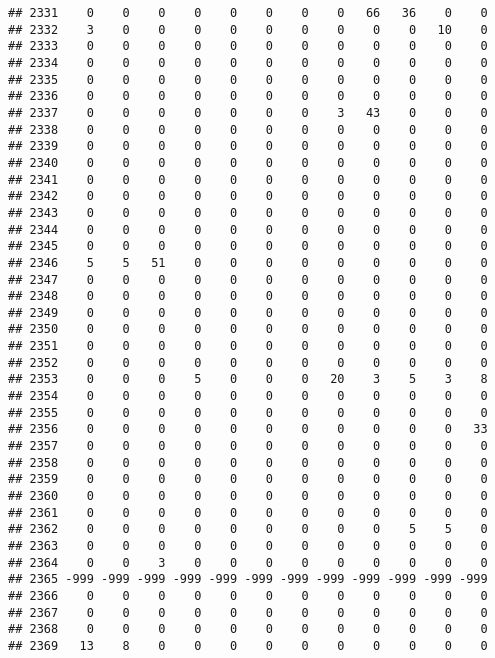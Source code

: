 \documentclass[]{article}
\begin{document}
\begin{verbatim}
## 2331    0    0    0    0    0    0    0    0   66   36    0    0
## 2332    3    0    0    0    0    0    0    0    0    0   10    0
## 2333    0    0    0    0    0    0    0    0    0    0    0    0
## 2334    0    0    0    0    0    0    0    0    0    0    0    0
## 2335    0    0    0    0    0    0    0    0    0    0    0    0
## 2336    0    0    0    0    0    0    0    0    0    0    0    0
## 2337    0    0    0    0    0    0    0    3   43    0    0    0
## 2338    0    0    0    0    0    0    0    0    0    0    0    0
## 2339    0    0    0    0    0    0    0    0    0    0    0    0
## 2340    0    0    0    0    0    0    0    0    0    0    0    0
## 2341    0    0    0    0    0    0    0    0    0    0    0    0
## 2342    0    0    0    0    0    0    0    0    0    0    0    0
## 2343    0    0    0    0    0    0    0    0    0    0    0    0
## 2344    0    0    0    0    0    0    0    0    0    0    0    0
## 2345    0    0    0    0    0    0    0    0    0    0    0    0
## 2346    5    5   51    0    0    0    0    0    0    0    0    0
## 2347    0    0    0    0    0    0    0    0    0    0    0    0
## 2348    0    0    0    0    0    0    0    0    0    0    0    0
## 2349    0    0    0    0    0    0    0    0    0    0    0    0
## 2350    0    0    0    0    0    0    0    0    0    0    0    0
## 2351    0    0    0    0    0    0    0    0    0    0    0    0
## 2352    0    0    0    0    0    0    0    0    0    0    0    0
## 2353    0    0    0    5    0    0    0   20    3    5    3    8
## 2354    0    0    0    0    0    0    0    0    0    0    0    0
## 2355    0    0    0    0    0    0    0    0    0    0    0    0
## 2356    0    0    0    0    0    0    0    0    0    0    0   33
## 2357    0    0    0    0    0    0    0    0    0    0    0    0
## 2358    0    0    0    0    0    0    0    0    0    0    0    0
## 2359    0    0    0    0    0    0    0    0    0    0    0    0
## 2360    0    0    0    0    0    0    0    0    0    0    0    0
## 2361    0    0    0    0    0    0    0    0    0    0    0    0
## 2362    0    0    0    0    0    0    0    0    0    5    5    0
## 2363    0    0    0    0    0    0    0    0    0    0    0    0
## 2364    0    0    3    0    0    0    0    0    0    0    0    0
## 2365 -999 -999 -999 -999 -999 -999 -999 -999 -999 -999 -999 -999
## 2366    0    0    0    0    0    0    0    0    0    0    0    0
## 2367    0    0    0    0    0    0    0    0    0    0    0    0
## 2368    0    0    0    0    0    0    0    0    0    0    0    0
## 2369   13    8    0    0    0    0    0    0    0    0    0    0

\end{verbatim}
\end{document}
